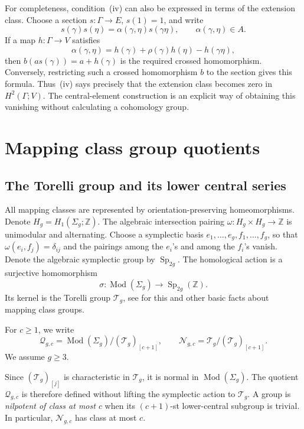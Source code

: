 \documentclass[11pt,a4paper]{article}
\theoremstyle{definition}
\newcommand{\Z}{\mathbb Z}
\newcommand{\Mod}{\operatorname{Mod}}
\newcommand{\Sp}{\operatorname{Sp}}
\begin{document}
For completeness, condition~(iv) can also be expressed in terms
of the extension class. Choose a section
\(s:\Gamma\to E\), \(s(1)=1\), and write
\[
 s(\gamma)s(\eta)
 =\alpha(\gamma,\eta)s(\gamma\eta),\qquad
 \alpha(\gamma,\eta)\in A.
\]
If a map \(h:\Gamma\to V\) satisfies
\[
 \alpha(\gamma,\eta)
 =h(\gamma)+\rho(\gamma)h(\eta)-h(\gamma\eta),
\]
then \(b(a s(\gamma))=a+h(\gamma)\) is the required
crossed homomorphism. Conversely, restricting such a crossed homomorphism \(b\)
to the section gives this formula. Thus~(iv) says precisely
that the extension class becomes zero in \(H^2(\Gamma;V)\).
The central-element construction is an explicit way of obtaining
this vanishing without calculating a cohomology group.

\section{Mapping class group quotients}
\label{sec:groups}

\subsection{The Torelli group and its lower central series}

All mapping classes are represented by orientation-preserving
homeomorphisms. Denote \(H_g=H_1(\Sigma_g;\Z)\). The algebraic
intersection pairing \(\omega:H_g\times H_g\to\Z\) is
unimodular and alternating. Choose a symplectic basis
\(e_1,\ldots,e_g,f_1,\ldots,f_g\), so that
\(\omega(e_i,f_j)=\delta_{ij}\) and the pairings among the
\(e_i\)'s and among the \(f_i\)'s vanish. Denote the algebraic
symplectic group by \(\Sp_{2g}\).
The homological action is a surjective homomorphism
\[
 \sigma:\Mod(\Sigma_g)\longrightarrow\Sp_{2g}(\Z).
\]
Its kernel is the Torelli group \(\mathcal{T}_g\), see \cite{FarbMargalit} for this and
other basic facts about mapping class groups. 

For \(c\ge1\), we write
\[
 \mathcal{Q}_{g,c}=\Mod(\Sigma_g)/(\mathcal{T}_g)_{[c+1]},
 \qquad
 \mathcal{N}_{g,c}=\mathcal{T}_g/(\mathcal{T}_g)_{[c+1]}.
\]
We assume \(g\ge3\).

Since \((\mathcal{T}_g)_{[j]}\) is characteristic in \(\mathcal{T}_g\), it is
normal in \(\Mod(\Sigma_g)\). The quotient \(\mathcal{Q}_{g,c}\) is therefore
defined without lifting the symplectic action to \(\mathcal{T}_g\).
A group is
\emph{nilpotent of class at most \(c\)} when its
\((c+1)\)-st lower-central subgroup is trivial. In particular,
\(\mathcal{N}_{g,c}\) has class at most \(c\).
\end{document}
